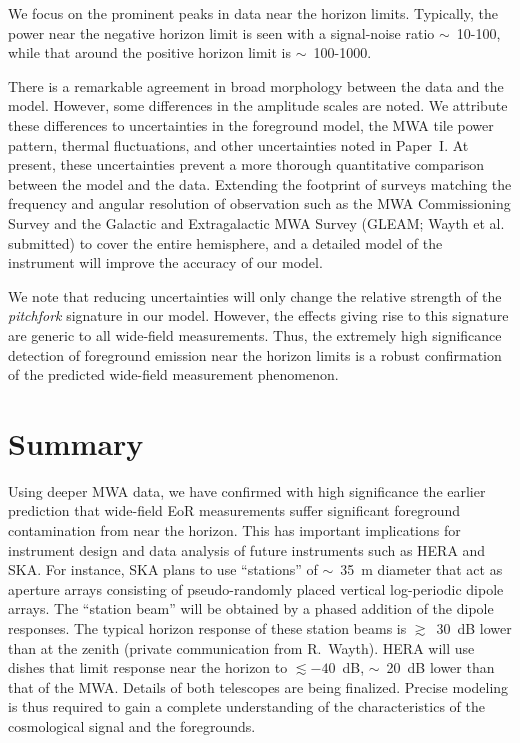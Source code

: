 \documentclass[preprint2,apjl,numberedappendix,twocolappendix,appendixfloats]{emulateapj}
\begin{document}
We focus on the prominent peaks in data near the horizon limits. Typically, the power near the negative horizon limit is seen with a signal-noise ratio $\sim$~10-100, while that around the positive horizon limit is $\sim$~100-1000. 

There is a remarkable agreement in broad morphology between the data and the model. However, some differences in the amplitude scales are noted. We attribute these differences to uncertainties in the foreground model, the MWA tile power pattern, thermal fluctuations, and other uncertainties noted in Paper~I. At present, these uncertainties prevent a more thorough quantitative comparison between the model and the data. Extending the footprint of surveys matching the frequency and angular resolution of observation such as the MWA Commissioning Survey \citep[MWACS;][]{hur14} and the Galactic and Extragalactic MWA Survey (GLEAM; Wayth et al. submitted) to cover the entire hemisphere, and a detailed model of the instrument will improve the accuracy of our model. 

We note that reducing uncertainties will only change the relative strength of the {\it pitchfork} signature in our model. However, the effects giving rise to this signature are generic to all wide-field measurements. Thus, the extremely high significance detection of foreground emission near the horizon limits is a robust confirmation of the predicted wide-field measurement phenomenon.

\section{Summary}\label{sec:summary}

Using deeper MWA data, we have confirmed with high significance the earlier prediction that wide-field EoR measurements suffer significant foreground contamination from near the horizon. This has important implications for instrument design and data analysis of future instruments such as HERA and SKA. For instance, SKA plans to use ``stations'' of $\sim$~35~m diameter that act as aperture arrays consisting of pseudo-randomly placed vertical log-periodic dipole arrays. The ``station beam'' will be obtained by a phased addition of the dipole responses. The typical horizon response of these station beams is $\gtrsim$~30~dB lower than at the zenith (private communication from R.~Wayth). HERA will use dishes that limit response near the horizon to $\lesssim -40$~dB, $\sim$~20~dB lower than that of the MWA. Details of both telescopes are being finalized. Precise modeling is thus required to gain a complete understanding of the characteristics of the cosmological signal and the foregrounds. 
\end{document}
